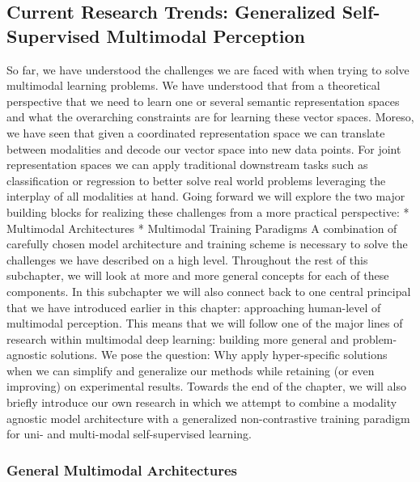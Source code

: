 \documentclass[
]{krantz}
\begin{document}
\hypertarget{current-research-trends-generalized-self-supervised-multimodal-perception}{%
\subsection{Current Research Trends: Generalized Self-Supervised Multimodal Perception}\label{current-research-trends-generalized-self-supervised-multimodal-perception}}

So far, we have understood the challenges we are faced with when trying to solve multimodal learning problems. We have understood that from a theoretical perspective that we need to learn one or several semantic representation spaces and what the overarching constraints are for learning these vector spaces. Moreso, we have seen that given a coordinated representation space we can translate between modalities and decode our vector space into new data points. For joint representation spaces we can apply traditional downstream tasks such as classification or regression to better solve real world problems leveraging the interplay of all modalities at hand.
Going forward we will explore the two major building blocks for realizing these challenges from a more practical perspective:
* Multimodal Architectures
* Multimodal Training Paradigms
A combination of carefully chosen model architecture and training scheme is necessary to solve the challenges we have described on a high level. Throughout the rest of this subchapter, we will look at more and more general concepts for each of these components. In this subchapter we will also connect back to one central principal that we have introduced earlier in this chapter: approaching human-level of multimodal perception. This means that we will follow one of the major lines of research within multimodal deep learning: building more general and problem-agnostic solutions. We pose the question: Why apply hyper-specific solutions when we can simplify and generalize our methods while retaining (or even improving) on experimental results.
Towards the end of the chapter, we will also briefly introduce our own research in which we attempt to combine a modality agnostic model architecture with a generalized non-contrastive training paradigm for uni- and multi-modal self-supervised learning.

\hypertarget{general-multimodal-architectures}{%
\subsubsection{General Multimodal Architectures}\label{general-multimodal-architectures}}
\end{document}
